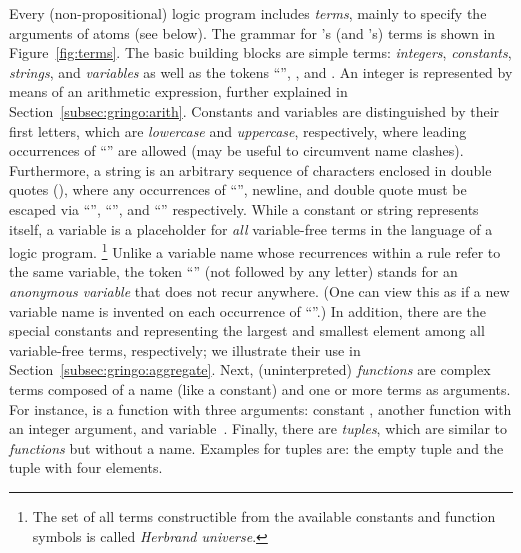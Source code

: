 Every (non-propositional) logic program includes \emph{terms},
mainly to specify the arguments of atoms (see below).
The grammar for \gringo's (and \clingo's) terms is shown in Figure~\ref{fig:terms}.
The basic building blocks are simple terms:
\emph{integers}, \emph{constants}, \emph{strings}, and \emph{variables}
as well as the tokens ``'', , and .
An integer is represented by means of an arithmetic expression,
further explained in Section~\ref{subsec:gringo:arith}.
Constants and variables are distinguished by their first letters,
which are \emph{lowercase} and \emph{uppercase}, respectively,
where leading occurrences of ``'' are allowed
(may be useful to circumvent name clashes).
Furthermore, a string is an arbitrary sequence of characters
enclosed in double quotes (),
where any occurrences of ``\code{\textbackslash}'', newline, and double quote %
must be escaped via ``\code{\textbackslash\textbackslash}'', ``'',
and ``'' respectively.
While a constant or string represents itself,
a variable is a placeholder for \emph{all} variable-free terms
in the language of a logic program.%
\footnote{The set of all terms constructible from the available
          constants and function symbols is called \emph{Herbrand universe}.}
Unlike a variable name whose recurrences within a rule refer to the same variable,
the token ``'' (not followed by any letter)
stands for an \emph{anonymous variable} that does not recur anywhere.
(One can view this as if a new variable name is invented on each
 occurrence of ``''.)
In addition, there are the special constants  and 
representing the largest and smallest element among all variable-free terms, respectively;
we illustrate their use in Section~\ref{subsec:gringo:aggregate}.
Next, (uninterpreted) \emph{functions} are complex terms composed of a name (like a constant)
and one or more terms as arguments. %
For instance,
is a function with three arguments:
constant , another function 
with an integer argument, and variable~.
Finally, there are \emph{tuples}, which are similar to \emph{functions} but without a name.
Examples for tuples are:
the empty tuple \code{()} and
the tuple  with four elements.

